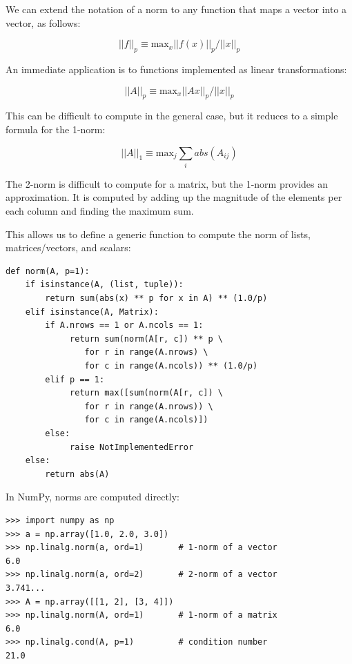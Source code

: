 \documentclass[justified, sixbynine]{tufte-book}
\def\ft{\small\tt}
\theoremstyle{plain}%
\newtheorem * {corollary}{Corollary}
\theoremstyle{definition}
\theoremstyle{remark}
\newtheorem * {remark}{Remark}
\newtheorem * {note}{Note}
\begin{document}
\begin{fullwidth}
We can extend the notation of a norm to any function that maps a vector into a vector, as follows:

\begin{equation}
||f||_p \equiv \textrm{max}_x ||f(x)||_p / ||x||_p
\end{equation}

An immediate application is to functions implemented as linear transformations:

\begin{equation}
||A||_p \equiv \textrm{max}_x ||Ax||_p / ||x||_p
\end{equation}

This can be difficult to compute in the general case, but it reduces to a simple formula for the 1-norm:

\begin{equation}
||A||_1 \equiv \textrm{max}_j \sum_i abs(A_{ij})
\end{equation}

The 2-norm is difficult to compute for a matrix, but the 1-norm provides an approximation. It is computed by adding up the magnitude of the elements per each column and finding the maximum sum.

This allows us to define a generic function to compute the norm of lists, matrices/vectors, and scalars:

\begin{lstlisting}[caption={in file: {\ft nlib.py}}]
def norm(A, p=1):
    if isinstance(A, (list, tuple)):
        return sum(abs(x) ** p for x in A) ** (1.0/p)
    elif isinstance(A, Matrix):
        if A.nrows == 1 or A.ncols == 1:
             return sum(norm(A[r, c]) ** p \
                for r in range(A.nrows) \
                for c in range(A.ncols)) ** (1.0/p)
        elif p == 1:
             return max([sum(norm(A[r, c]) \
                for r in range(A.nrows)) \
                for c in range(A.ncols)])
        else:
             raise NotImplementedError
    else:
        return abs(A)
\end{lstlisting}

In NumPy, norms are computed directly:

\begin{lstlisting}
>>> import numpy as np
>>> a = np.array([1.0, 2.0, 3.0])
>>> np.linalg.norm(a, ord=1)       # 1-norm of a vector
6.0
>>> np.linalg.norm(a, ord=2)       # 2-norm of a vector
3.741...
>>> A = np.array([[1, 2], [3, 4]])
>>> np.linalg.norm(A, ord=1)       # 1-norm of a matrix
6.0
>>> np.linalg.cond(A, p=1)         # condition number
21.0
\end{lstlisting}


\end{fullwidth}
\end{document}
